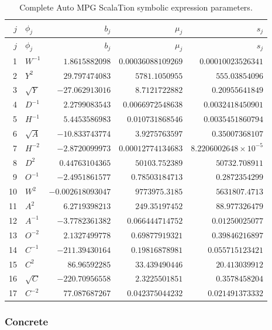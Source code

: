 \documentclass{article}
\begin{document}
{\scriptsize\setlength{\tabcolsep}{3pt}
\begin{longtable}{rlrrr}
\caption{Complete Auto MPG ScalaTion symbolic expression parameters.}\label{tab:auto-mpg-symbolic-complete}\\
\toprule
$j$ & $\phi_j$ & $b_j$ & $\mu_j$ & $s_j$ \\
\midrule\endfirsthead
\toprule
$j$ & $\phi_j$ & $b_j$ & $\mu_j$ & $s_j$ \\
\midrule\endhead
1 & $W^{-1}$ & $1.8615882098$ & $0.00036088109269$ & $0.00010023526341$ \\
2 & $Y^{2}$ & $29.797474083$ & $5781.1050955$ & $555.03854096$ \\
3 & $\sqrt{Y}$ & $-27.062913016$ & $8.7121722882$ & $0.20955641849$ \\
4 & $D^{-1}$ & $2.2799083543$ & $0.0066972548638$ & $0.0032418450901$ \\
5 & $H^{-1}$ & $5.4453586983$ & $0.010731868546$ & $0.0035451860794$ \\
6 & $\sqrt{A}$ & $-10.833743774$ & $3.9275763597$ & $0.35007368107$ \\
7 & $H^{-2}$ & $-2.8720099973$ & $0.00012774134683$ & $8.2206002648\times10^{-5}$ \\
8 & $D^{2}$ & $0.44763104365$ & $50103.752389$ & $50732.708911$ \\
9 & $O^{-1}$ & $-2.4951861577$ & $0.78503184713$ & $0.2872354299$ \\
10 & $W^{2}$ & $-0.002618093047$ & $9773975.3185$ & $5631807.4713$ \\
11 & $A^{2}$ & $6.2719398213$ & $249.35197452$ & $88.977326479$ \\
12 & $A^{-1}$ & $-3.7782361382$ & $0.066444714752$ & $0.01250025077$ \\
13 & $O^{-2}$ & $2.1327499778$ & $0.69877919321$ & $0.39846216897$ \\
14 & $C^{-1}$ & $-211.39430164$ & $0.19816878981$ & $0.055715123421$ \\
15 & $C^{2}$ & $86.96592285$ & $33.439490446$ & $20.413039912$ \\
16 & $\sqrt{C}$ & $-220.70956558$ & $2.3225501851$ & $0.3578458204$ \\
17 & $C^{-2}$ & $77.087687267$ & $0.042375044232$ & $0.021491373332$ \\
\bottomrule\end{longtable}}

\subsubsection{Concrete}
\end{document}
